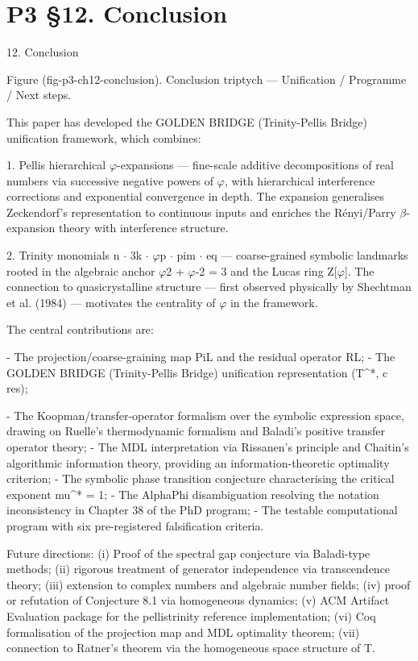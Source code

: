 
\section{P3 §12. Conclusion}

12. Conclusion

      Figure (fig-p3-ch12-conclusion). Conclusion triptych --- Unification / Programme / Next steps.

  This paper has developed the GOLDEN BRIDGE (Trinity-Pellis Bridge) unification framework, which combines:

  1. Pellis hierarchical $\varphi$-expansions --- fine-scale additive decompositions of real numbers
  via successive negative powers of $\varphi$, with hierarchical interference corrections and
  exponential convergence in depth. The expansion generalises Zeckendorf's
  representation to continuous inputs and enriches the Rényi/Parry $\beta$-expansion theory
  with interference structure.

  2. Trinity monomials n $\cdot$ 3k $\cdot$ $\varphi$p $\cdot$ pim $\cdot$ eq --- coarse-grained symbolic landmarks rooted
  in the algebraic anchor $\varphi$2 + $\varphi$-2 = 3 and the Lucas ring Z[$\varphi$]. The connection to
  quasicrystalline structure --- first observed physically by Shechtman et al. (1984) ---
  motivates the centrality of $\varphi$ in the framework.

  The central contributions are:

  - The projection/coarse-graining map PiL and the residual operator RL;
  - The GOLDEN BRIDGE (Trinity-Pellis Bridge) unification representation (T^*, c res);

  - The Koopman/transfer-operator formalism over the symbolic expression space,
  drawing on Ruelle's thermodynamic formalism and Baladi's positive transfer operator
  theory;
  - The MDL interpretation via Rissanen's principle and Chaitin's algorithmic information
  theory, providing an information-theoretic optimality criterion;
  - The symbolic phase transition conjecture characterising the critical exponent mu^* =
  1;
  - The AlphaPhi disambiguation resolving the notation inconsistency in Chapter 38 of the
  PhD program;
  - The testable computational program with six pre-registered falsification criteria.

  Future directions: (i) Proof of the spectral gap conjecture via Baladi-type methods; (ii)
  rigorous treatment of generator independence via transcendence theory; (iii) extension
  to complex numbers and algebraic number fields; (iv) proof or refutation of Conjecture
  8.1 via homogeneous dynamics; (v) ACM Artifact Evaluation package for the
  pellistrinity reference implementation; (vi) Coq formalisation of the projection map and
  MDL optimality theorem; (vii) connection to Ratner's theorem via the homogeneous
  space structure of T.

